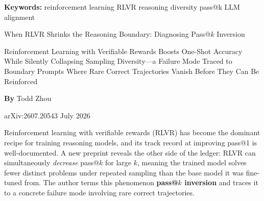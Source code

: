 \documentclass[10pt,twocolumn]{article}
\begin{document}
\setlength{\parindent}{0pt}
\setlength{\parskip}{4pt}

{\small\color{keywordgray}\textbf{Keywords:}
  reinforcement learning \textbullet{}
  RLVR \textbullet{}
  reasoning diversity \textbullet{}
  pass@k \textbullet{}
  LLM alignment}\par\vspace{4pt}

{\LARGE\bfseries\raggedright
  When RLVR Shrinks the Reasoning Boundary:
  Diagnosing Pass@$k$ Inversion}\par\vspace{4pt}

{\large\itshape\raggedright
  Reinforcement Learning with Verifiable Rewards Boosts One-Shot Accuracy
  While Silently Collapsing Sampling Diversity---a Failure Mode Traced
  to Boundary Prompts Where Rare Correct Trajectories Vanish Before
  They Can Be Reinforced}\par\vspace{6pt}

{\small\textbf{By} Todd Zhou}\par\vspace{2pt}

{\small\color{keywordgray}arXiv:2607.20543 \textbullet{} July 2026}
\par\vspace{2pt}\noindent{\color{rulered}\rule{\columnwidth}{0.6pt}}\vspace{6pt}

Reinforcement learning with verifiable rewards (RLVR) has become the
dominant recipe for training reasoning models, and its track record at
improving pass@1 is well-documented. A new preprint reveals the other
side of the ledger: RLVR can simultaneously \emph{decrease} pass@$k$
for large $k$, meaning the trained model solves fewer distinct problems
under repeated sampling than the base model it was fine-tuned from.
The author terms this phenomenon \textbf{pass@$k$ inversion} and
traces it to a concrete failure mode involving rare correct trajectories.
\end{document}

